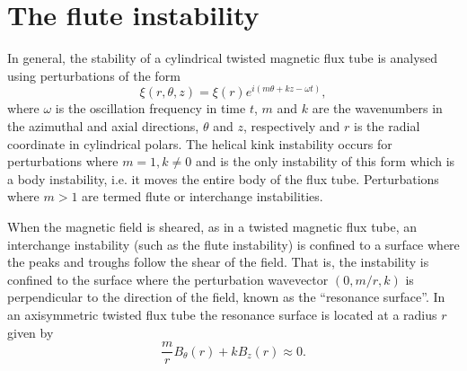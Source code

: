 \documentclass[fleqn,usenatbib]{mnras}
\begin{document}
\section{The flute instability}
\label{sec-flute-intro}

In general, the stability of a cylindrical twisted magnetic flux tube is analysed using perturbations of the form
\begin{equation}
  \label{eq:kink_perturbation}
\xi(r, \theta, z) = \xi(r) e^{i(m\theta + kz -\omega t)},
\end{equation}
where $\omega$ is the oscillation frequency in time $t$, $m$ and $k$
are the wavenumbers in the azimuthal and axial directions, $\theta$
and $z$, respectively and $r$ is the radial coordinate in cylindrical 
polars. The helical kink instability occurs for perturbations where $m=1,
k\ne0$ and is the only instability of this form which is a body instability,
i.e.{} it moves the entire body of the flux tube. Perturbations where $m>1$
are termed flute or interchange instabilities.

When the magnetic field is sheared, as in a twisted magnetic flux tube, an
interchange instability (such as the flute instability) is confined to
a surface where the peaks and troughs follow the shear of the field. That is,
the instability is confined to the surface where the perturbation wavevector
$(0, m/r, k)$ is perpendicular to the direction of the field, known as the
``resonance surface''. In an axisymmetric twisted flux tube the resonance
surface is located at a radius $r$ given by
\begin{equation}
  \label{eq:resonant_surface}
\frac{m}{r} B_{\theta}(r) + kB_z(r) \approx 0.
\end{equation}
\end{document}
